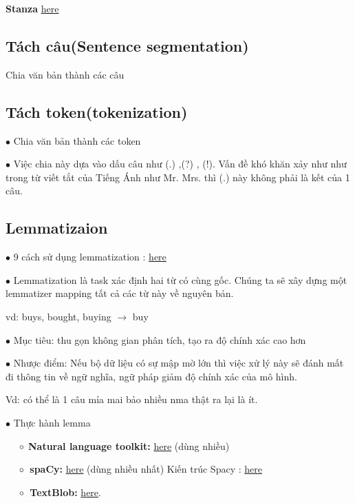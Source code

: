 \documentclass[final,letterpaper,twoside,12pt]{report}
\begin{document}
\textbf{Stanza }\href{https://stanfordnlp.github.io/stanza/index.html}{here}
\subsection{Tách câu(Sentence segmentation)}

Chia văn bản thành các câu

\subsection{Tách token(tokenization)}

$\bullet$ Chia văn bản thành các token

$\bullet$ Việc chia này dựa vào dấu câu như (.) ,(?) , (!). Vấn đề khó khăn xảy như như trong từ viết tắt của Tiếng Ánh như Mr. Mrs. thì (.) này không phải là kết của 1 câu.


\subsection{Lemmatizaion}
$\bullet$ 9 cách sử dụng lemmatization : \href{https://www.geeksforgeeks.org/python-lemmatization-approaches-with-examples/}{here}

$\bullet$ Lemmatization là task xác định hai từ có cùng gốc. Chúng ta sẽ xây dựng một lemmatizer mapping tất cả các từ này về nguyên bản.

vd: buys, bought, buying $\rightarrow$ buy

$\bullet$ Mục tiêu: thu gọn không gian phân tích, tạo ra độ chính xác cao hơn


$\bullet$ Nhược điểm: Nếu bộ dữ liệu có sự mập mờ lớn thì việc xử lý này sẽ đánh mất đi thông tin về ngữ nghĩa, ngữ pháp giảm độ chính xác của mô hình.

Vd: có thể là 1 câu mỉa mai bảo nhiều nma thật ra lại là ít.

$\bullet$ Thực hành lemma

$\hspace*{0.5cm} \circ$ \textbf{Natural language toolkit: } \href{https://www.nltk.org/}{here} (dùng nhiều)

$\hspace*{0.5cm} \circ$\ \textbf{spaCy: }\href{https://spacy.io/}{here} (dùng nhiều nhất)  Kiến trúc Spacy : \href{https://spacy.io/usage/spacy-101#architecture}{here}

$\hspace*{0.5cm} \circ$\ \textbf{TextBlob: }\href{https://textblob.readthedocs.io/en/dev/}{here}.
\end{document}
